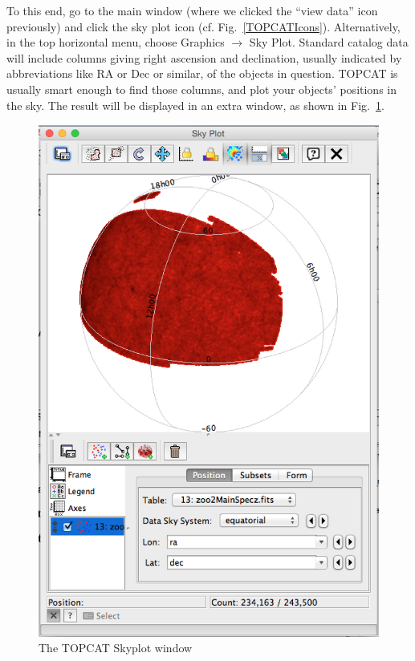 \documentclass[twocolumn,apj]{openjournal}
\begin{document}
To this end, go to the main window (where we clicked the ``view data'' icon previously) and click the sky plot icon (cf. Fig.~\ref{TOPCATIcons}). Alternatively, in the top horizontal menu, choose Graphics $\to$ Sky Plot. Standard catalog data will include columns giving right ascension and declination, usually indicated by abbreviations like RA or Dec or similar, of the objects in question. TOPCAT is usually smart enough to find those columns, and plot your objects' positions in the sky. The result will be displayed in an extra window, as shown in Fig.~\ref{TOPCATSkyplot}.
\begin{figure}[htbp]
\begin{center}
\includegraphics[width=\linewidth]{skyplot-window.png}
\caption{The TOPCAT Skyplot window}
\label{TOPCATSkyplot}
\end{center}
\end{figure}
\end{document}

